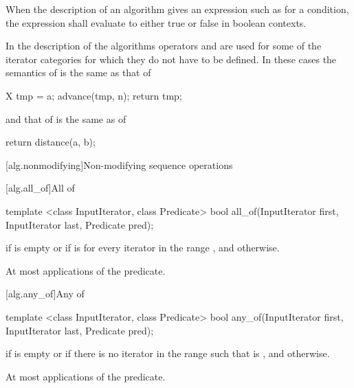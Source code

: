 \pnum
When the description of an algorithm gives an expression such as
for a condition, the expression shall evaluate to
either true or false in boolean contexts.

\pnum
In the description of the algorithms operators
\tcode{+}
and
\tcode{-}
are used for some of the iterator categories for which
they do not have to be defined.
In these cases the semantics of
is the same as that of

\begin{codeblock}
X tmp = a;
advance(tmp, n);
return tmp;
\end{codeblock}

and that of
is the same as of

\begin{codeblock}
return distance(a, b);
\end{codeblock}

[alg.nonmodifying]{Non-modifying sequence operations}

[alg.all_of]{All of}

%
\begin{itemdecl}
template <class InputIterator, class Predicate>
  bool all_of(InputIterator first, InputIterator last, Predicate pred);
\end{itemdecl}

\begin{itemdescr}
\pnum
\returns {} if
 is empty or if
 is  for every iterator  in the range , and  otherwise.

\pnum
\complexity At most  applications of the predicate.
\end{itemdescr}

[alg.any_of]{Any of}

%
\begin{itemdecl}
template <class InputIterator, class Predicate>
  bool any_of(InputIterator first, InputIterator last, Predicate pred);
\end{itemdecl}

\begin{itemdescr}
\pnum
\returns {} if  is empty or
if there is no iterator  in the range
 such that  is , and  otherwise.

\pnum
\complexity At most  applications of the predicate.
\end{itemdescr}


